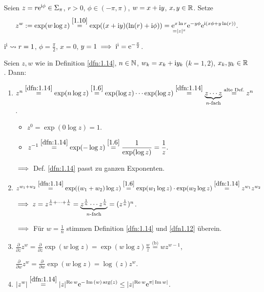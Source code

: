 \documentclass[a4paper,twoside,DIV15,BCOR12mm]{scrbook}
\begin{document}
\begin{dfn}\label{dfn:1.14}
Seien $z=r\mathrm{e}^{\mathrm{i}\phi}\in\Sigma_\pi$, $r>0$, $\phi\in(-\pi,\pi)$, $w = x+\mathrm{i} y$, $x,y\in\mathbb{R}$. Setze
\[z^w := \exp(w\log z)\stackrel{\eqref{1.10}}{=}\exp((x+\mathrm{i} y)(\ln(r)+\mathrm{i}\phi)) = \underset{=|z|^x}{\mathrm{e}^{x\ln r}} \mathrm{e}^{-y\phi}\mathrm{e}^{\mathrm{i}(x\phi + y\ln(r))}.\]
\end{dfn}

\begin{bsp*}
$\mathrm{i}^{\mathrm{i}} \leadsto r = 1$, $\phi = \frac{\pi}{2}$, $x =0$, $y=1 \implies \mathrm{i}^{\mathrm{i}} = \mathrm{e}^{-\frac{\pi}{2}}$.
\end{bsp*}

\begin{bem}\label{bem:1.15}
Seien $z,w$ wie in Definition \ref{dfn:1.14}, $n\in\mathbb{N}$, $w_k=x_k+\mathrm{i} y_k$ ($k=1,2$), $x_k,y_k\in\mathbb{R}$. Dann:
\begin{enumerate}
\item $z^n \stackrel{\ref{dfn:1.14}}{=} \exp (n \log z) \stackrel{\eqref{1.6}}{=} \exp(\log z)\dotsm\exp(\log z) \stackrel{\ref{dfn:1.14}}{=} \underbrace{z\dotsm z}_{n\text{-fach}} \stackrel{\text{alte Def.}}{=} z^n$.
\begin{itemize}
\item $z^0 = \exp(0\log z) = 1$.
\item $\displaystyle z^{-1} \stackrel{\ref{dfn:1.14}}{=} \exp(-\log z) \stackrel{\eqref{1.6}}{=}\frac{1}{\exp(\log z)} = \frac{1}{z}.$
\end{itemize}
$\implies$ Def. \ref{dfn:1.14} passt zu ganzen Exponenten.

\item $z^{w_1+w_2} \stackrel{\ref{dfn:1.14}}{=} \exp((w_1+w_2)\log z) \stackrel{\eqref{1.6}}{=}\exp(w_1\log z)\cdot\exp(w_2\log z) \stackrel{\ref{dfn:1.14}}{=}z^{w_1}z^{w_2}$

$\implies z = z^{\frac{1}{n} + \dotsm + \frac{1}{n}} = \underbrace{z^{\frac{1}{n}}\dotsm z^{\frac{1}{n}}}_{n\text{-fach}} = (z^{\frac{1}{n}})^n$.

$\implies$ Für $w=\frac{1}{n}$ stimmen Definition \ref{dfn:1.14} und \ref{dfn1.12} überein.

\item $\displaystyle \frac{\partial}{\partial z}z^w = \frac{\partial}{\partial z}\exp(w \log z) = \exp(w\log z)\frac{w}{z} \stackrel{\text{(b)}}{=}wz^{w-1}$,

$\displaystyle\frac{\partial}{\partial w} z^w = \frac{\partial}{\partial w} \exp (w\log z) = \log (z) z^w$.

\item $\displaystyle |z^w| \stackrel{\ref{dfn:1.14}}{=} |z|^{\operatorname{Re}{w}}\mathrm{e}^{-\operatorname{Im}{(w)}\arg(z)} \leq |z|^{\operatorname{Re}{w}}\mathrm{e}^{\pi|\operatorname{Im}{w}|}$.
\end{enumerate}
\end{bem}
\end{document}
